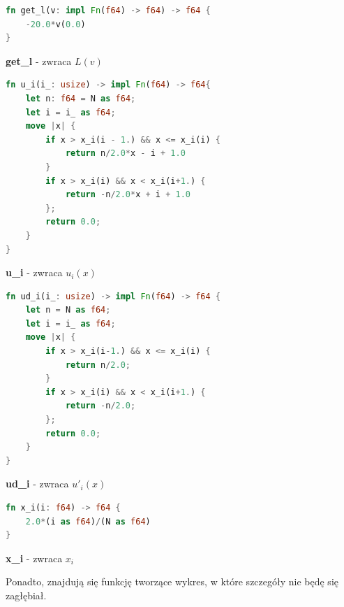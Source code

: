 \documentclass[12pt]{article}
\begin{document}
\begin{lstlisting}[language=Rust, style=boxed]
fn get_l(v: impl Fn(f64) -> f64) -> f64 {
	-20.0*v(0.0)
}
\end{lstlisting}
\centerline{\textbf{get\_l} - zwraca $L(v)$}

\begin{lstlisting}[language=Rust, style=boxed]
fn u_i(i_: usize) -> impl Fn(f64) -> f64{
	let n: f64 = N as f64;
	let i = i_ as f64;
	move |x| {
		if x > x_i(i - 1.) && x <= x_i(i) { 
			return n/2.0*x - i + 1.0
		}
		if x > x_i(i) && x < x_i(i+1.) { 
			return -n/2.0*x + i + 1.0
		};
		return 0.0;
	}
}
\end{lstlisting}
\centerline{\textbf{u\_i} - zwraca $u_i(x)$}
\vskip 1cm

\begin{lstlisting}[language=Rust, style=boxed]
fn ud_i(i_: usize) -> impl Fn(f64) -> f64 {
	let n = N as f64;
	let i = i_ as f64;
	move |x| {
		if x > x_i(i-1.) && x <= x_i(i) { 
			return n/2.0;
		}
		if x > x_i(i) && x < x_i(i+1.) { 
			return -n/2.0;
		};
		return 0.0;
	}
}
\end{lstlisting}
\centerline{\textbf{ud\_i} - zwraca $u'_i(x)$}
\vskip 1cm

\begin{lstlisting}[language=Rust, style=boxed]
fn x_i(i: f64) -> f64 {
	2.0*(i as f64)/(N as f64)
}
\end{lstlisting}
\centerline{\textbf{x\_i} - zwraca $x_i$}
\vskip 1cm

\noindent Ponadto, znajdują się funkcję tworzące wykres, w które szczegóły nie
 będę się zagłębiał.
\end{document}
